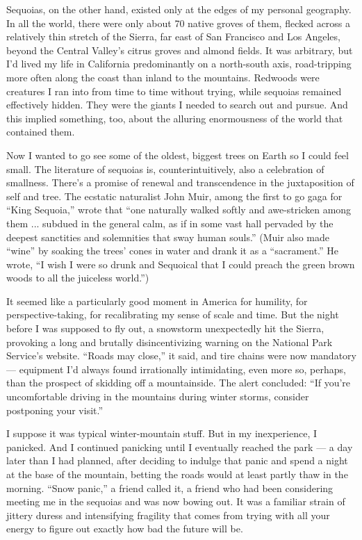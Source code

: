 Sequoias, on the other hand, existed only at the edges of my personal
geography. In all the world, there were only about 70 native groves of
them, flecked across a relatively thin stretch of the Sierra, far east
of San Francisco and Los Angeles, beyond the Central Valley's citrus
groves and almond fields. It was arbitrary, but I'd lived my life in
California predominantly on a north-south axis, road-tripping more often
along the coast than inland to the mountains. Redwoods were creatures I
ran into from time to time without trying, while sequoias remained
effectively hidden. They were the giants I needed to search out and
pursue. And this implied something, too, about the alluring enormousness
of the world that contained them.

Now I wanted to go see some of the oldest, biggest trees on Earth so I
could feel small. The literature of sequoias is, counterintuitively,
also a celebration of smallness. There's a promise of renewal and
transcendence in the juxtaposition of self and tree. The ecstatic
naturalist John Muir, among the first to go gaga for ``King Sequoia,''
wrote that ``one naturally walked softly and awe-stricken among them ...
subdued in the general calm, as if in some vast hall pervaded by the
deepest sanctities and solemnities that sway human souls.'' (Muir also
made ``wine'' by soaking the trees' cones in water and drank it as a
``sacrament.'' He wrote, ``I wish I were so drunk and Sequoical that I
could preach the green brown woods to all the juiceless world.'')

It seemed like a particularly good moment in America for humility, for
perspective-taking, for recalibrating my sense of scale and time. But
the night before I was supposed to fly out, a snowstorm unexpectedly hit
the Sierra, provoking a long and brutally disincentivizing warning on
the National Park Service's website. ``Roads may close,'' it said, and
tire chains were now mandatory --- equipment I'd always found
irrationally intimidating, even more so, perhaps, than the prospect of
skidding off a mountainside. The alert concluded: ``If you're
uncomfortable driving in the mountains during winter storms, consider
postponing your visit.''

I suppose it was typical winter-mountain stuff. But in my inexperience,
I panicked. And I continued panicking until I eventually reached the
park --- a day later than I had planned, after deciding to indulge that
panic and spend a night at the base of the mountain, betting the roads
would at least partly thaw in the morning. ``Snow panic,'' a friend
called it, a friend who had been considering meeting me in the sequoias
and was now bowing out. It was a familiar strain of jittery duress and
intensifying fragility that comes from trying with all your energy to
figure out exactly how bad the future will be.

